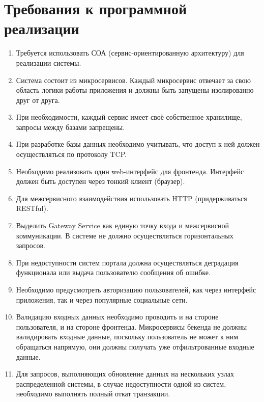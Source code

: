 \section*{Требования к программной реализации}
\begin{enumerate}
	\item Требуется использовать СОА (сервис-ориентированную архитектуру) для реализации системы.
	
	\item Система состоит из микросервисов. Каждый микросервис отвечает за свою область логики работы приложения и должны быть запущены изолированно друг от друга.
	
	\item При необходимости, каждый сервис имеет своё собственное хранилище,  запросы между базами запрещены.
	
	\item При разработке базы данных необходимо учитывать, что доступ к ней должен осуществляться по протоколу TCP.
	
	\item Необходимо  реализовать  один  web-интерфейс  для  фронтенда.  Интерфейс  должен  быть  доступен  через  тонкий  клиент (браузер).
	
	\item Для межсервисного взаимодействия использовать HTTP (придерживаться RESTful).
	
	\item Выделить Gateway Service как единую точку входа и межсервисной коммуникации. В системе не должно осуществляться горизонтальных запросов.
	
	\item При недоступности систем портала должна осуществляться деградация	функционала или выдача пользователю сообщения об ошибке.
	
	\item Необходимо предусмотреть авторизацию пользователей, как через интерфейс приложения, так и через популярные социальные сети.
	
	\item Валидацию входных данных необходимо проводить и на стороне  пользователя,  и  на  стороне  фронтенда. Микросервисы бекенда не должны валидировать входные данные, поскольку пользователь не может к ним обращаться напрямую, они должны получать уже отфильтрованные входные данные.
	
	\item Для запросов, выполняющих обновление данных на нескольких узлах распределенной системы, в случае недоступности одной из систем, необходимо выполнять полный откат транзакции.
	

\end{enumerate}
